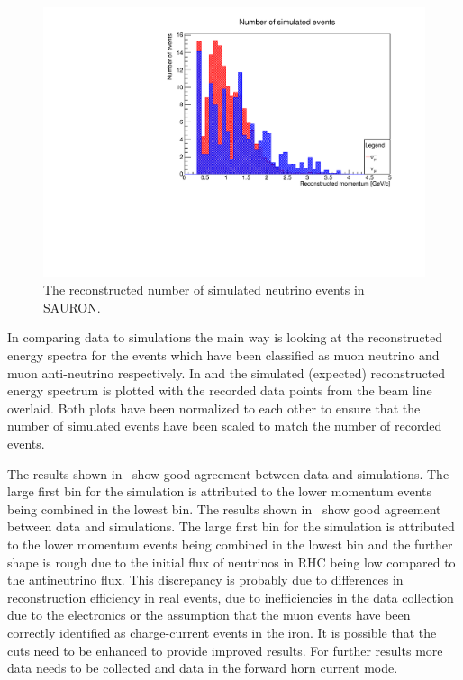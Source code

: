 \begin{figure}[h!]
\centering
\includegraphics[width=.9\textwidth]{figures/NeutrinoChap/NumSimEvents.pdf}
\caption{The reconstructed number of simulated neutrino events in SAURON.}
\label{fig:NumSim}
\end{figure}

In comparing data to simulations the main way is looking at the reconstructed energy spectra for the events which have been classified as muon neutrino and muon anti-neutrino respectively. In  and  the simulated (expected) reconstructed energy spectrum is plotted with the recorded data points from the beam line overlaid. Both plots have been normalized to each other to ensure that the number of simulated events have been scaled to match the number of recorded events.

The results shown in~  show good agreement between data and simulations. The large first bin for the simulation is attributed to the lower momentum events being combined in the lowest bin. The results shown in~  show good agreement between data and simulations. The large first bin for the simulation is attributed to the lower momentum events being combined in the lowest bin and the further shape is rough due to the initial flux of neutrinos in RHC being low compared to the antineutrino flux. This discrepancy is probably due to differences in reconstruction efficiency in real events, due to inefficiencies in the data collection due to the electronics or the assumption that the muon events have been correctly identified as charge-current events in the iron. It is possible that the cuts need to be enhanced to provide improved results. For further results more data needs to be collected and data in the forward horn current mode.

